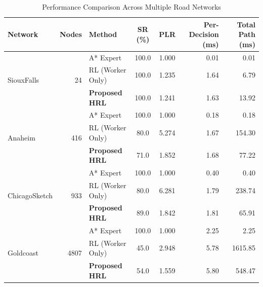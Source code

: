 \begin{table}[t]
  \centering
  \caption{Performance Comparison Across Multiple Road Networks}
  \label{tab:scalability}
  \begin{tabular}{l r l c c r r}
    \toprule
    \textbf{Network} & \textbf{Nodes} & \textbf{Method} & \textbf{SR (\%)} & \textbf{PLR} & \textbf{Per-Decision (ms)} & \textbf{Total Path (ms)} \\
    \midrule
    \multirow{3}{*}{SiouxFalls} & \multirow{3}{*}{24} & A* Expert & 100.0 & 1.000 & 0.01 & 0.01 \\
    & & RL (Worker Only) & 100.0 & 1.235 & 1.64 & 6.79 \\
    & & \textbf{Proposed HRL} & 100.0 & 1.241 & 1.63 & 13.92 \\
    \midrule
    \multirow{3}{*}{Anaheim} & \multirow{3}{*}{416} & A* Expert & 100.0 & 1.000 & 0.18 & 0.18 \\
    & & RL (Worker Only) & 80.0 & 5.274 & 1.67 & 154.30 \\
    & & \textbf{Proposed HRL} & 71.0 & 1.852 & 1.68 & 77.22 \\
    \midrule
    \multirow{3}{*}{ChicagoSketch} & \multirow{3}{*}{933} & A* Expert & 100.0 & 1.000 & 0.40 & 0.40 \\
    & & RL (Worker Only) & 80.0 & 6.281 & 1.79 & 238.74 \\
    & & \textbf{Proposed HRL} & 89.0 & 1.842 & 1.81 & 65.91 \\
    \midrule
    \multirow{3}{*}{Goldcoast} & \multirow{3}{*}{4807} & A* Expert & 100.0 & 1.000 & 2.25 & 2.25 \\
    & & RL (Worker Only) & 45.0 & 2.948 & 5.78 & 1615.85 \\
    & & \textbf{Proposed HRL} & 54.0 & 1.559 & 5.80 & 548.47 \\
    \bottomrule
  \end{tabular}
\end{table}
